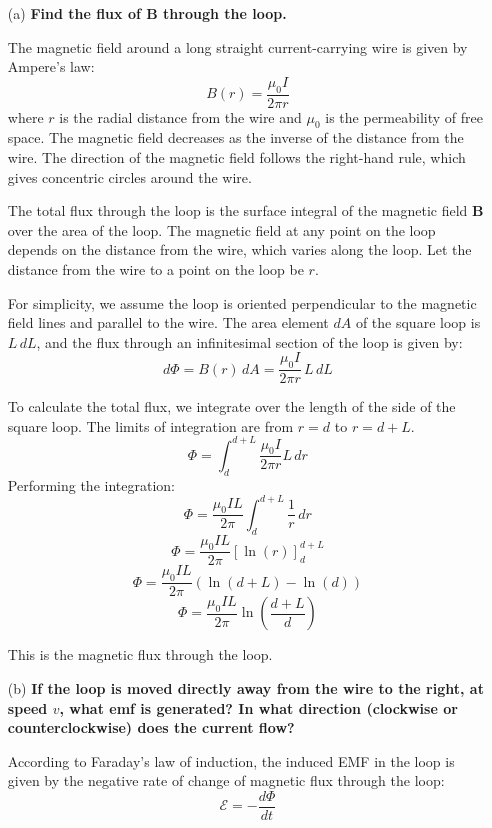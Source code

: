 \begin{enumerate}
    \item[(a)] \textbf{Find the flux of $\mathbf{B}$ through the loop.}
    
    The magnetic field around a long straight current-carrying wire is given by Ampere's law:
    \[
    B(r) = \frac{\mu_0 I}{2\pi r}
    \]
    where $r$ is the radial distance from the wire and $\mu_0$ is the permeability of free space. The magnetic field decreases as the inverse of the distance from the wire. The direction of the magnetic field follows the right-hand rule, which gives concentric circles around the wire.
    
    The total flux through the loop is the surface integral of the magnetic field $\mathbf{B}$ over the area of the loop. The magnetic field at any point on the loop depends on the distance from the wire, which varies along the loop. Let the distance from the wire to a point on the loop be $r$.
    
    For simplicity, we assume the loop is oriented perpendicular to the magnetic field lines and parallel to the wire. The area element $dA$ of the square loop is $L \, dL$, and the flux through an infinitesimal section of the loop is given by:
    \[
    d\Phi = B(r) \, dA = \frac{\mu_0 I}{2\pi r} \, L \, dL
    \]
    
    To calculate the total flux, we integrate over the length of the side of the square loop. The limits of integration are from $r = d$ to $r = d + L$.
    \[
    \Phi = \int_d^{d+L} \frac{\mu_0 I}{2\pi r} L \, dr
    \]
    Performing the integration:
    \[
    \Phi = \frac{\mu_0 I L}{2\pi} \int_d^{d+L} \frac{1}{r} \, dr
    \]
    \[
    \Phi = \frac{\mu_0 I L}{2\pi} \left[ \ln(r) \right]_d^{d+L}
    \]
    \[
    \Phi = \frac{\mu_0 I L}{2\pi} \left( \ln(d+L) - \ln(d) \right)
    \]
    \[
    \Phi = \frac{\mu_0 I L}{2\pi} \ln \left( \frac{d+L}{d} \right)
    \]
    
    This is the magnetic flux through the loop.

    \item[(b)] \textbf{If the loop is moved directly away from the wire to the right, at speed $v$, what emf is generated? In what direction (clockwise or counterclockwise) does the current flow?}
    
    According to Faraday's law of induction, the induced EMF in the loop is given by the negative rate of change of magnetic flux through the loop:
    \[
    \mathcal{E} = -\frac{d\Phi}{dt}
    \]
    

\end{enumerate}
